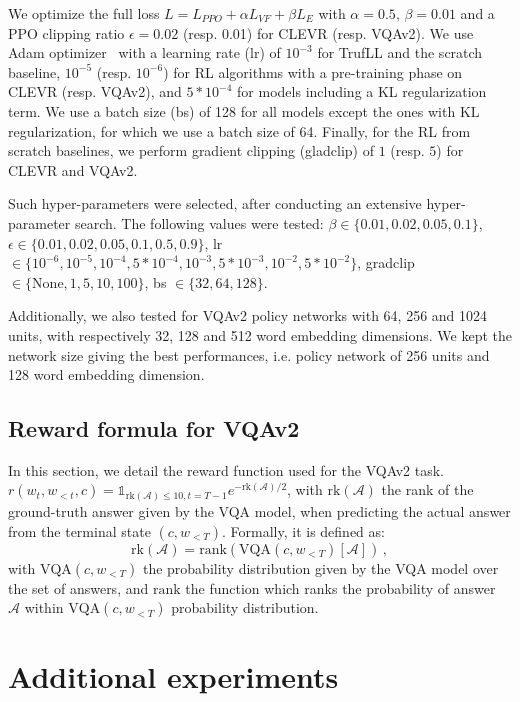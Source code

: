 \documentclass{article}
\newcommand{\answer}{\mathcal{A}}
\newcommand{\algo}{TrufLL\xspace}
\newcommand{\indicatrice}[1]{\mathds{1}_{#1}}
\begin{document}
We optimize the full loss $L = L_{PPO} + \alpha L_{VF} + \beta L_{E}$ with $\alpha=0.5$, $\beta=0.01$ and a PPO clipping ratio $\epsilon=0.02$ (resp. 0.01) for CLEVR (resp. VQAv2). We use Adam optimizer~\citep{kingma2014adam} with a learning rate (lr) of $10^{-3}$ for \algo and the scratch baseline, $10^{-5}$ (resp. $10^{-6}$) for RL algorithms with a pre-training phase on CLEVR (resp. VQAv2), and $5*10^{-4}$ for models including a KL regularization term. We use a batch size (bs) of 128 for all models except the ones with KL regularization, for which we use a batch size of 64. Finally, for the RL from scratch baselines, we perform gradient clipping (gladclip) of $1$ (resp. $5$) for CLEVR and VQAv2.  

Such hyper-parameters were selected, after conducting an extensive hyper-parameter search. The following values were tested:
$\beta \in \{0.01, 0.02, 0.05, 0.1\}$, $\epsilon \in \{0.01, 0.02, 0.05, 0.1, 0.5, 0.9\}$,  lr $\in \{10^{-6}, 10^{-5}, 10^{-4}, 5*10^{-4}, 10^{-3}, 5*10^{-3}, 10^{-2}, 5*10^{-2}\}$,  gradclip $\in \{\mathrm{None}, 1, 5, 10, 100\}$, bs $\in \{32, 64, 128\}$.  

Additionally, we also tested for VQAv2 policy networks with 64, 256 and 1024 units, with respectively 32, 128  and 512 word embedding dimensions. We kept the network size giving the best performances, i.e. policy network of 256 units and 128 word embedding dimension. 


\subsection{Reward formula for VQAv2}
\label{sec:app:reward}
In this section, we detail the reward function used for the VQAv2 task. 
$r(w_t, w_{<t}, c) = \indicatrice{\mathrm{rk}(\answer)\leq 10, t=T-1}e^{-\mathrm{rk}(\answer)/2}$, with $\mathrm{rk}(\answer)$ the rank of the ground-truth answer given by the VQA model, when predicting the actual answer from the terminal state $(c,w_{<T})$. Formally, it is defined as: $$\mathrm{rk}(\answer)=\mathrm{rank}(\mathrm{VQA}(c,w_{<T})[\answer])\,,$$ with $\mathrm{VQA}(c,w_{<T})$ the probability distribution given by the VQA model over the set of answers, and $\mathrm{rank}$ the function which ranks the probability of answer $\answer$ within $\mathrm{VQA}(c,w_{<T})$ probability distribution. 

\section{Additional experiments}
\label{sec:app:addtional_xp}
\end{document}

